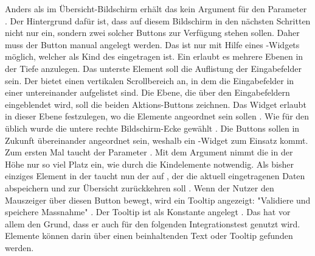Anders als im Übersicht-Bildschirm erhält das  kein Argument für den Parameter . Der Hintergrund dafür ist, dass auf diesem Bildschirm in den nächsten Schritten nicht nur ein, sondern zwei solcher Buttons zur Verfügung stehen sollen.  Daher muss der Button manual angelegt werden. Das ist nur mit Hilfe eines -Widgets möglich, welcher als Kind des  eingetragen ist. Ein  erlaubt es mehrere Ebenen in der Tiefe anzulegen. Das unterste Element soll die Auflistung der Eingabefelder sein. Der   bietet einen vertikalen Scrollbereich an, in dem die Eingabefelder in einer   untereinander aufgelistet sind. Die Ebene, die  über den Eingabefeldern eingeblendet wird, soll die beiden Aktions-Buttons zeichnen. Das Widget  erlaubt in dieser Ebene festzulegen, wo die Elemente angeordnet sein sollen . Wie für den  üblich wurde die untere rechte Bildschirm-Ecke gewählt . Die Buttons sollen in Zukunft übereinander angeordnet sein, weshalb ein -Widget zum Einsatz kommt. Zum ersten Mal taucht der Parameter . Mit dem Argument  nimmt die  in der Höhe nur so viel Platz ein, wie durch die Kindelemente notwendig. Als bisher einziges Element in der   taucht nun der  auf , der die aktuell eingetragenen Daten abspeichern  und zur Übersicht zurückkehren soll . Wenn der Nutzer den Mauszeiger über diesen Button bewegt, wird ein Tooltip angezeigt: "Validiere und speichere Massnahme" . Der Tooltip ist als Konstante angelegt . Das hat vor allem den Grund, dass er auch für den folgenden Integrationstest genutzt wird. Elemente können darin über einen beinhaltenden Text oder Tooltip gefunden werden.



